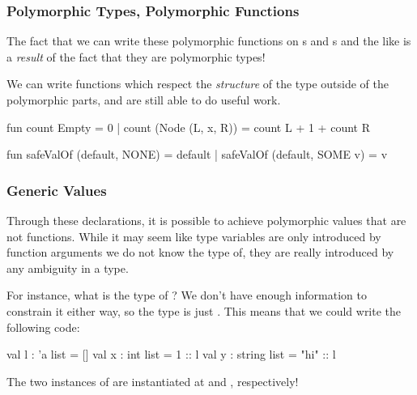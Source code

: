 \documentclass[aspectratio=169, handout]{beamer}
\begin{document}
\begin{frame}[fragile]
  \frametitle{Polymorphic Types, Polymorphic Functions}

  The fact that we can write these polymorphic functions on s and
  s and the like is a \textit{result} of the fact that they are
  polymorphic types!

  \pause
  \vspace{\fill}

  We can write functions which respect the \textit{structure} of the type
  outside of the polymorphic parts, and are still able to do useful work.

  \pause
  \vspace{\fill}

  \begin{codeblock}
    fun count Empty = 0
      | count (Node (L, x, R)) = count L + 1 + count R

    fun safeValOf (default, NONE)   = default
      | safeValOf (default, SOME v) = v
  \end{codeblock}
\end{frame}

\begin{frame}[fragile]
  \frametitle{Generic Values}

  Through these declarations, it is possible to achieve polymorphic values that
  are not functions. While it may seem like type variables are only introduced
  by function arguments we do not know the type of, they are really introduced by
  any ambiguity in a type.

  \pause
  \vspace{\fill}

  For instance, what is the type of \code{[]}? We don't have enough information
  to constrain it either way, so the type is just . This means that
  we could write the following code:

  \pause
  \vspace{\fill}

  \begin{codeblock}
    val l : 'a list = []
    val x : int list = 1 :: l
    val y : string list = "hi" :: l
  \end{codeblock}

  \pause
  The two instances of  are instantiated at  and
  , respectively!
\end{frame}
\end{document}
